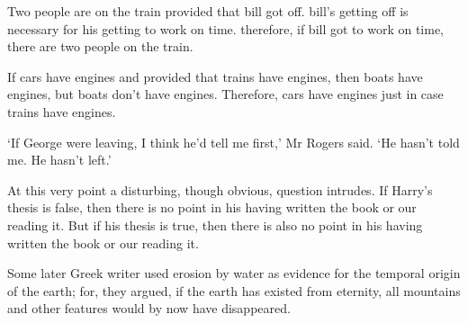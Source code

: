 \begin{enumerate}
	\begin{statement}{Two people are on the train provided that bill got off. bill's
			getting off is necessary for his getting to work on time. therefore, if bill
			got to work on time, there are two people on the train.}
	\end{statement}

	\begin{statement}{If cars have engines and provided that trains have engines,
			then boats have engines, but boats don't have engines. Therefore, cars have
			engines just in case trains have engines.}
	\end{statement}

	\begin{statement}{‘If George were leaving, I think he'd tell me first,' Mr
			Rogers said. ‘He hasn't told me. He hasn't left.'}
	\end{statement}

	\begin{statement}{At this very point a disturbing, though obvious, question
			intrudes. If Harry's thesis is false, then there is no point in his having
			written the book or our reading it. But if his thesis is true, then there is
			also no point in his having written the book or our reading it.}
	\end{statement}

	\begin{statement}{Some later Greek writer used erosion by water as evidence for
			the temporal origin of the earth; for, they argued, if the earth has
			existed from eternity, all mountains and other features would by now have
			disappeared.}
	\end{statement}
\end{enumerate}

% 
